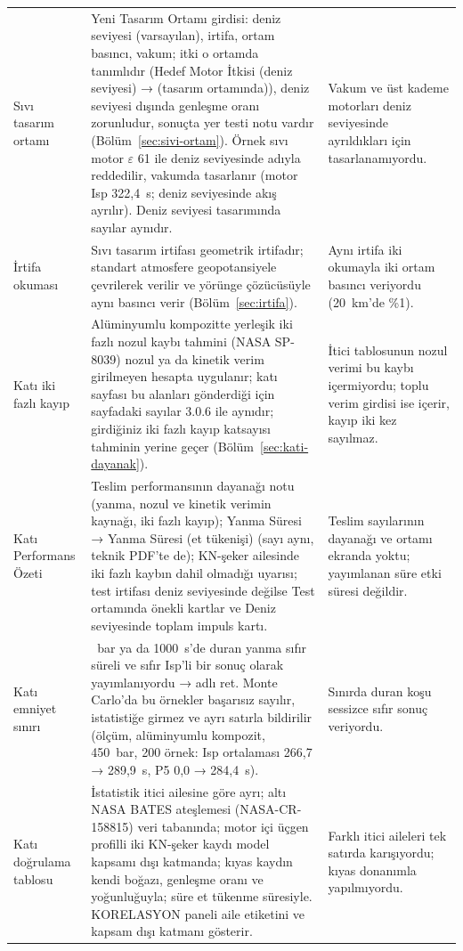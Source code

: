 \documentclass[11pt,a4paper]{article}
\newcommand{\ui}[1]{\textsf{#1}}
\begin{document}
\begin{longtable}{@{}>{\raggedright\arraybackslash}p{3.0cm}>{\raggedright\arraybackslash}p{8.0cm}>{\raggedright\arraybackslash}p{4.6cm}@{}}
Sıvı tasarım ortamı & Yeni \ui{Tasarım Ortamı} girdisi: deniz seviyesi (varsayılan), irtifa, ortam basıncı, vakum; itki o ortamda tanımlıdır (\ui{Hedef Motor İtkisi (deniz seviyesi)} → \ui{(tasarım ortamında)}), deniz seviyesi dışında genleşme oranı zorunludur, sonuçta yer testi notu vardır (Bölüm~\ref{sec:sivi-ortam}). Örnek sıvı motor $\varepsilon$ 61 ile deniz seviyesinde adıyla reddedilir, vakumda tasarlanır (motor Isp 322,4~s; deniz seviyesinde akış ayrılır). Deniz seviyesi tasarımında sayılar aynıdır. & Vakum ve üst kademe motorları deniz seviyesinde ayrıldıkları için tasarlanamıyordu. \\
İrtifa okuması & Sıvı tasarım irtifası geometrik irtifadır; standart atmosfere geopotansiyele çevrilerek verilir ve yörünge çözücüsüyle aynı basıncı verir (Bölüm~\ref{sec:irtifa}). & Aynı irtifa iki okumayla iki ortam basıncı veriyordu (20~km'de \%1). \\
Katı iki fazlı kayıp & Alüminyumlu kompozitte yerleşik iki fazlı nozul kaybı tahmini (NASA SP-8039) nozul ya da kinetik verim girilmeyen hesapta uygulanır; katı sayfası bu alanları gönderdiği için sayfadaki sayılar 3.0.6 ile aynıdır; girdiğiniz iki fazlı kayıp katsayısı tahminin yerine geçer (Bölüm~\ref{sec:kati-dayanak}). & İtici tablosunun nozul verimi bu kaybı içermiyordu; toplu verim girdisi ise içerir, kayıp iki kez sayılmaz. \\
Katı Performans Özeti & \ui{Teslim performansının dayanağı} notu (yanma, nozul ve kinetik verimin kaynağı, iki fazlı kayıp); \ui{Yanma Süresi} → \ui{Yanma Süresi (et tükenişi)} (sayı aynı, teknik PDF'te de); KN-şeker ailesinde iki fazlı kaybın dahil olmadığı uyarısı; test irtifası deniz seviyesinde değilse \ui{Test ortamında} önekli kartlar ve \ui{Deniz seviyesinde toplam impuls} kartı. & Teslim sayılarının dayanağı ve ortamı ekranda yoktu; yayımlanan süre etki süresi değildir. \\
Katı emniyet sınırı & 500~bar ya da 1000~s'de duran yanma sıfır süreli ve sıfır Isp'li bir sonuç olarak yayımlanıyordu → adlı ret. Monte Carlo'da bu örnekler başarısız sayılır, istatistiğe girmez ve ayrı satırla bildirilir (ölçüm, alüminyumlu kompozit, 450~bar, 200 örnek: Isp ortalaması 266,7 → 289,9~s, P5 0,0 → 284,4~s). & Sınırda duran koşu sessizce sıfır sonuç veriyordu. \\
Katı doğrulama tablosu & İstatistik itici ailesine göre ayrı; altı NASA BATES ateşlemesi (NASA-CR-158815) veri tabanında; motor içi üçgen profilli iki KN-şeker kaydı model kapsamı dışı katmanda; kıyas kaydın kendi boğazı, genleşme oranı ve yoğunluğuyla; süre et tükenme süresiyle. \ui{KORELASYON} paneli aile etiketini ve kapsam dışı katmanı gösterir. & Farklı itici aileleri tek satırda karışıyordu; kıyas donanımla yapılmıyordu. \\

\end{longtable}
\end{document}
